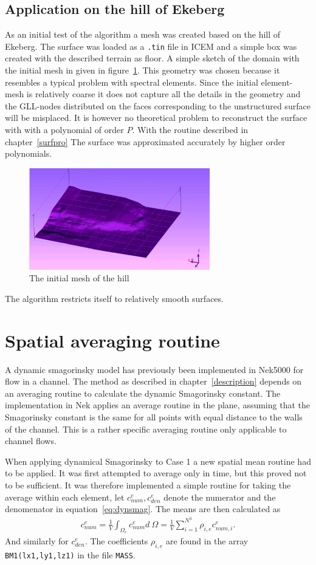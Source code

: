 \subsection{Application on the hill of Ekeberg}
As an initial test of the algorithm a mesh was created based on the hill of Ekeberg.
The surface was loaded as a \verb|.tin| file in ICEM and a simple box was created with 
the described terrain as floor. A simple sketch of the domain with the initial mesh in given in 
figure~\ref{fig:ekeberg}. This geometry was chosen because it resembles a typical problem with 
spectral elements. Since the initial element-mesh is relatively coarse it does not capture all 
the details in the geometry and the GLL-nodes distributed on the faces corresponding to the 
unstructured surface will be misplaced. It is however no theoretical problem to reconstruct the 
surface with with a polynomial of order $P$. With the routine described in chapter~\ref{surfpro}
The surface was approximated accurately by higher order polynomials.
%
\begin{figure}[t]
    \centering
	\includegraphics[width=0.7\textwidth]{Figures/mesh_ekebergaasen2.png}
    \caption{The initial mesh of the hill}
	\label{fig:ekeberg}
\end{figure}
%
The algorithm restricts itself to relatively smooth surfaces.
\section{Spatial averaging routine}
A dynamic smagorinsky model has previously been implemented in Nek5000 for flow in a channel. 
The method as described in chapter~\ref{description} depends on an averaging routine to calculate
the dynamic Smagorinsky constant. The implementation in Nek applies an average routine in the plane,
assuming that the Smagorinsky constant is the same for all points with equal distance to the walls 
of the channel. This is a rather specific averaging routine only applicable to channel flows.

When applying dynamical Smagorinsky to Case 1 a new spatial mean routine had to be applied. 
It was first attempted to average only in time, but this proved not to be sufficient. It was
therefore implemented a simple routine for taking the average within each element, let 
$c_{num}^e,c_{den}^e$ denote the numerator and the denomenator in equation~\ref{eq:dynsmag}.
The means are then calculated as 
\begin{align}
    c_{num}^e = \frac{1}{V}\int_{\Omega_e}c_{num}^e d\: \Omega 
    = \frac{1}{V}\sum_{i = 1}^{N^3}\rho_{i,e}c_{num,i}^{e}.
    \label{eq:averageroutine}
\end{align}
And similarly for $c_{den}^e$.
The coefficients $\rho_{i,e}$ are found in the array \verb|BM1(lx1,ly1,lz1)| in the file 
\verb|MASS|.
